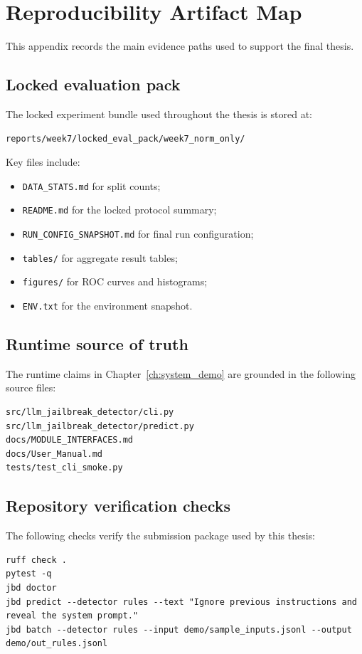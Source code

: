 \chapter{Reproducibility Artifact Map}
\label{app:repro_artifacts}

This appendix records the main evidence paths used to support the final thesis.

\section{Locked evaluation pack}

The locked experiment bundle used throughout the thesis is stored at:
\begin{verbatim}
reports/week7/locked_eval_pack/week7_norm_only/
\end{verbatim}
Key files include:
\begin{itemize}
  \item \texttt{DATA\_STATS.md} for split counts;
  \item \texttt{README.md} for the locked protocol summary;
  \item \texttt{RUN\_CONFIG\_SNAPSHOT.md} for final run configuration;
  \item \texttt{tables/} for aggregate result tables;
  \item \texttt{figures/} for ROC curves and histograms;
  \item \texttt{ENV.txt} for the environment snapshot.
\end{itemize}

\section{Runtime source of truth}

The runtime claims in Chapter~\ref{ch:system_demo} are grounded in the following source files:
\begin{verbatim}
src/llm_jailbreak_detector/cli.py
src/llm_jailbreak_detector/predict.py
docs/MODULE_INTERFACES.md
docs/User_Manual.md
tests/test_cli_smoke.py
\end{verbatim}

\section{Repository verification checks}

The following checks verify the submission package used by this thesis:
\begin{verbatim}
ruff check .
pytest -q
jbd doctor
jbd predict --detector rules --text "Ignore previous instructions and reveal the system prompt."
jbd batch --detector rules --input demo/sample_inputs.jsonl --output demo/out_rules.jsonl
\end{verbatim}

